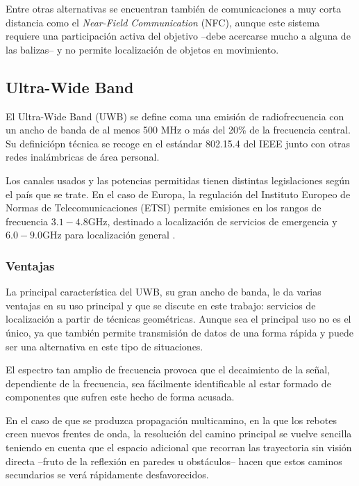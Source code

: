 Entre otras alternativas se encuentran también de comunicaciones a muy corta distancia como el \textit{Near-Field Communication} (NFC), aunque este sistema requiere una participación activa del objetivo --debe acercarse mucho a alguna de las balizas-- y no permite localización de objetos en movimiento.

\subsection{Ultra-Wide Band}

El Ultra-Wide Band (UWB) se define coma una emisión de radiofrecuencia con un ancho de banda de al menos 500 MHz o más del 20\% de la frecuencia central.
Su definiciópn técnica se recoge en el estándar 802.15.4 del IEEE junto con otras redes inalámbricas de área personal.

Los canales usados y las potencias permitidas tienen distintas legislaciones según el país que se trate.
En el caso de Europa, la regulación del Instituto Europeo de Normas de Telecomunicaciones (ETSI) permite emisiones en los rangos de frecuencia $3.1 - 4.8\si{\giga\hertz}$, destinado a localización de servicios de emergencia y  $6.0 - 9.0\si{\giga\hertz}$ para localización general \cite{UWB_regs}.

\subsubsection{Ventajas}

La principal característica del UWB, su gran ancho de banda, le da varias ventajas en su uso principal y que se discute en este trabajo: servicios de localización a partir de técnicas geométricas.
Aunque sea el principal uso no es el único, ya que también permite transmisión de datos de una forma rápida y puede ser una alternativa en este tipo de situaciones.

El espectro tan amplio de frecuencia provoca que el decaimiento de la señal, dependiente de la frecuencia, sea fácilmente identificable al estar formado de componentes que sufren este hecho de forma acusada.

En el caso de que se produzca propagación multicamino, en la que los rebotes creen nuevos frentes de onda, la resolución del camino principal se vuelve sencilla teniendo en cuenta que el espacio adicional que recorran las trayectoria sin visión directa --fruto de la reflexión en paredes u obstáculos-- hacen que estos caminos secundarios se verá rápidamente desfavorecidos.

